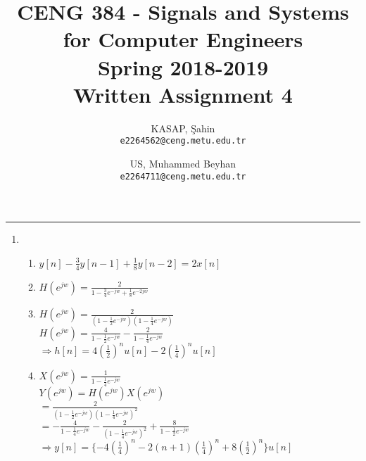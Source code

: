 \documentclass[10pt,a4paper, margin=1in]{article}
\author{
  KASAP, Şahin\\
  \texttt{e2264562@ceng.metu.edu.tr}
  \and
  US, Muhammed Beyhan\\
  \texttt{e2264711@ceng.metu.edu.tr}
}
\title{CENG 384 - Signals and Systems for Computer Engineers \\
Spring 2018-2019 \\
Written Assignment 4}
\begin{document}
\maketitle



\noindent\rule{19cm}{1.2pt}

\begin{enumerate}

\item 
    \begin{enumerate}
    \item %
	$ y[n]- \frac{3}{4}y[n-1]+\frac{1}{8}y[n-2]=2x[n] $ \\
	$ $ \\

    \item %
	$H(e^{jw})=\frac{2}{1-\frac{3}{4}e^{-jw}+\frac{1}{8}e^{-2jw}} $ \\
    $ $ \\



    \item %
    $H(e^{jw})=\frac{2}{(1-\frac{1}{2}e^{-jw})(1-\frac{1}{4}e^{-jw})} $ \\
    $H(e^{jw})= \frac{4}{1-\frac{1}{2}e^{-jw}}-\frac{2}{1-\frac{1}{4}e^{-jw}} $ \\
        $ $ \\


    $\Rightarrow h[n]=4(\frac{1}{2})^nu[n]-2(\frac{1}{4})^nu[n] $ \\
    $ $ \\


    \item %
    $X(e^{jw})=\frac{1}{1-\frac{1}{4}e^{-jw}} $ \\
	$Y(e^{jw})=H(e^{jw})X(e^{jw}) $ \\
    $=\frac{2}{(1-\frac{1}{2}e^{-jw})(1-\frac{1}{4}e^{-jw})^2} $ \\
	$=-\frac{4}{1-\frac{1}{4}e^{-jw}}-\frac{2}{(1-\frac{1}{4}e^{-jw})^2}+\frac{8}{1-\frac{1}{2}e^{-jw}} $ \\
    $\Rightarrow y[n]=\lbrace -4(\frac{1}{4})^n-2(n+1)(\frac{1}{4})^n+8(\frac{1}{2})^n\rbrace u[n] $ \\
	$ $ \\
    $ $ \\
    
    \end{enumerate}



\end{enumerate}
\end{document}

